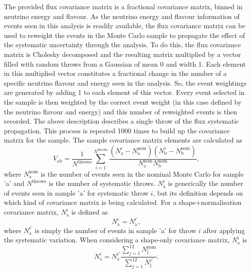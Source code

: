 The provided flux covariance matrix is a fractional covariance matrix, binned in neutrino energy and flavour.  As the neutrino energy and flavour information of events seen in this analysis is readily available, the flux covariance matrix can be used to reweight the events in the Monte Carlo sample to propagate the effect of the systematic uncertainty through the analysis.  To do this, the flux covariance matrix is Cholesky decomposed and the resulting matrix multiplied by a vector filled with random throws from a Gaussian of mean 0 and width 1.  Each element in this multiplied vector constitutes a fractional change in the number of a specific neutrino flavour and energy seen in the analysis.  So, the event weightings are generated by adding 1 to each element of this vector.  Every event selected in the sample is then weighted by the correct event weight (in this case defined by the neutrino flavour and energy) and this number of reweighted events is then recorded.  The above description describes a single throw of the flux systematic propagation.  This process is repeated 1000 times to build up the covariance matrix for the sample.  The sample covariance matrix elements are calculated as
\begin{equation}
  V_{\textrm{ab}} = \frac{1}{N^{\textrm{throws}}}\sum^{N^{\textrm{throws}}}_{i=1}\frac{\left(N_{\textrm{a}}^{i} - N_{\textrm{a}}^{\textrm{nom}}\right)\left(N_{\textrm{b}}^{i} - N_{\textrm{b}}^{\textrm{nom}}\right)}{N_{\textrm{a}}^{\textrm{nom}}N_{\textrm{b}}^{\textrm{nom}}},
  \label{eqn:CovarianceMatrixElementDef}
\end{equation}
where $N_{\textrm{a}}^{\textrm{nom}}$ is the number of events seen in the nominal Monte Carlo for sample 'a' and $N^{\textrm{throws}}$ is the number of systematic throws. $N_{\textrm{a}}^{i}$ is generically the number of events seen in sample 'a' for systematic throw $i$, but its definition depends on which kind of covariance matrix is being calculated.  For a shape+normalisation covariance matrix, $N_{\textrm{a}}^{i}$ is defined as 
\begin{equation}
  N_{\textrm{a}}^{i} = N^{i\prime}_{\textrm{a}}, 
  \label{eqn:NVariedDef}
\end{equation}
where $N^{i\prime}_{\textrm{a}}$ is simply the number of events in sample 'a' for throw $i$ after applying the systematic variation.  When considering a shape-only covariance matrix, $N_{\textrm{a}}^{i}$ is 
\begin{equation}
  N_{\textrm{a}}^{i} = N^{i\prime}_{\textrm{a}}\frac{\displaystyle\sum_{j=1}^{12}N_{\textrm{j}}^{\textrm{nom}}}{\displaystyle\sum_{j=1}^{12}N^{i\prime}_{\textrm{j}}}. 
  \label{eqn:NVariedShapeOnlyDef}
\end{equation}
